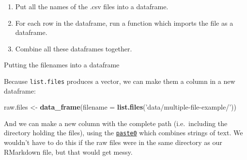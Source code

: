 \documentclass[]{article}
\newenvironment{Shaded}{\begin{snugshade}}{\end{snugshade}}
\newcommand{\CommentTok}[1]{\textcolor[rgb]{0.56,0.35,0.01}{\textit{#1}}}
\newcommand{\DataTypeTok}[1]{\textcolor[rgb]{0.13,0.29,0.53}{#1}}
\newcommand{\DecValTok}[1]{\textcolor[rgb]{0.00,0.00,0.81}{#1}}
\newcommand{\ErrorTok}[1]{\textcolor[rgb]{0.64,0.00,0.00}{\textbf{#1}}}
\newcommand{\KeywordTok}[1]{\textcolor[rgb]{0.13,0.29,0.53}{\textbf{#1}}}
\newcommand{\NormalTok}[1]{#1}
\newcommand{\OperatorTok}[1]{\textcolor[rgb]{0.81,0.36,0.00}{\textbf{#1}}}
\newcommand{\StringTok}[1]{\textcolor[rgb]{0.31,0.60,0.02}{#1}}
\providecommand{\tightlist}{%
  \setlength{\itemsep}{0pt}\setlength{\parskip}{0pt}}
\begin{document}
\begin{enumerate}
\def\labelenumi{\arabic{enumi}.}
\tightlist
\item
  Put all the names of the .csv files into a dataframe.
\item
  For each row in the dataframe, run a function which imports the file as a
  dataframe.
\item
  Combine all these dataframes together.
\end{enumerate}

Putting the filenames into a dataframe

Because \texttt{list.files} produces a vector, we can make them a column in a new
dataframe:

\begin{Shaded}
\begin{Highlighting}[]
\NormalTok{raw.files <-}\StringTok{ }\KeywordTok{data_frame}\NormalTok{(}\DataTypeTok{filename =} \KeywordTok{list.files}\NormalTok{(}\StringTok{'data/multiple-file-example/'}\NormalTok{))}
\end{Highlighting}
\end{Shaded}

And we can make a new column with the complete path (i.e.~including the
directory holding the files), using the \protect\hyperlink{paste}{\texttt{paste0}} which combines
strings of text. We wouldn't have to do this if the raw files were in the same
directory as our RMarkdown file, but that would get messy.

\begin{Shaded}
\end{Shaded}
\end{document}
